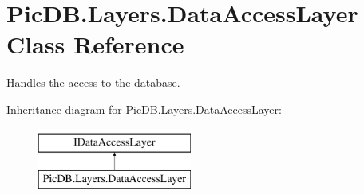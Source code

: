 \hypertarget{class_pic_d_b_1_1_layers_1_1_data_access_layer}{}\section{Pic\+D\+B.\+Layers.\+Data\+Access\+Layer Class Reference}
\label{class_pic_d_b_1_1_layers_1_1_data_access_layer}


Handles the access to the database.  


Inheritance diagram for Pic\+D\+B.\+Layers.\+Data\+Access\+Layer\+:\begin{figure}[H]
\begin{center}
\leavevmode
\includegraphics[height=2.000000cm]{class_pic_d_b_1_1_layers_1_1_data_access_layer}
\end{center}
\end{figure}
